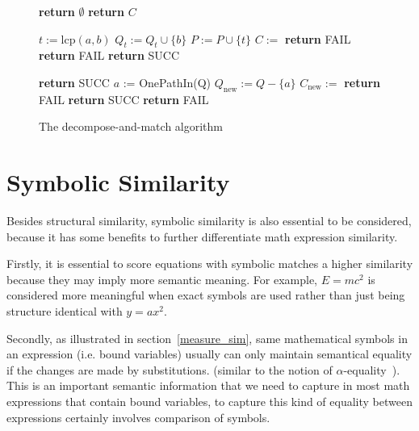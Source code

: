 \begin{figure}
\begin{algorithmic}[1]

\State \textbf{return} $\emptyset$ 
\Else
{} 
\EndIf
\EndFor
\State \textbf{return} $C$
\EndProcedure

\State {}

\State $t := \mathrm{lcp}(a,b)$
\State $Q_t := Q_t \cup \{b\}$
\State $P := P \cup \{t\}$
\EndFor
{}
\State $C := $ 
\State \textbf{return} FAIL
\EndIf
\EndIf
\EndFor
\EndFor
{} 
\State \textbf{return} FAIL
\EndIf
\EndFor
\State \textbf{return} SUCC 
\EndProcedure

\State {}

 \textbf{return} SUCC 
\EndIf
\State $a$ := OnePathIn(Q)
\State $Q_{\mathrm{new}} := Q - \{a\}$
\State $C_{\mathrm{new}} := $ 
 \textbf{return} FAIL 
\EndIf
{}
\textbf{return} SUCC 
\EndIf
\EndFor
\State \textbf{return} FAIL
\EndProcedure

\end{algorithmic}
\caption{The decompose-and-match algorithm}\label{submatchalgo}
\end{figure}

\section{Symbolic Similarity}
\label{symSimi}
Besides structural similarity, symbolic similarity is also essential to be considered,
because it has some benefits to further differentiate math expression similarity.

Firstly, it is essential to score equations with symbolic matches a higher similarity because they may imply more semantic meaning. 
For example, $E=mc^2$ is considered more meaningful when exact symbols are used rather than just being structure identical with $y=ax^2$.

Secondly, as illustrated in section~\ref{measure_sim}, same mathematical symbols in an expression (i.e. bound variables) usually can only maintain semantical equality if the changes are made by substitutions. (similar to the notion of $\alpha$-equality~\cite{Hindley1986}). 
This is an important semantic information that we need to capture 
in most math expressions that contain bound variables, to capture this kind of equality between expressions certainly involves comparison of symbols. 


